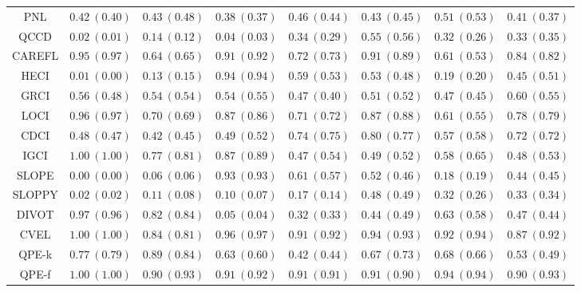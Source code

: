 \documentclass{article}
\theoremstyle{plain}
\theoremstyle{definition}
\theoremstyle{remark}
\begin{document}
{\begin{table}[!htbp]
\begin{center}
{\begin{tabular}{c|ccc|cccc}
PNL& $0.42\ (0.40)$& $0.43\ (0.48)$& $0.38\ (0.37)$& $0.46\ (0.44)$& $0.43\ (0.45)$& $0.51\ (0.53)$& $0.41\ (0.37)$ \\
QCCD& $0.02\ (0.01)$& $0.14\ (0.12)$& $0.04\ (0.03)$& $0.34\ (0.29)$& $0.55\ (0.56)$& $0.32\ (0.26)$& $0.33\ (0.35)$ \\
CAREFL& $0.95\ (0.97)$& $0.64\ (0.65)$& $0.91\ (0.92)$& $0.72\ (0.73)$& $0.91\ (0.89)$& $0.61\ (0.53)$& $0.84\ (0.82)$ \\
HECI& $0.01\ (0.00)$& $0.13\ (0.15)$& $0.94\ (0.94)$& $0.59\ (0.53)$& $0.53\ (0.48)$& $0.19\ (0.20)$& $0.45\ (0.51)$ \\
GRCI& $0.56\ (0.48)$& $0.54\ (0.54)$& $0.54\ (0.55)$& $0.47\ (0.40)$& $0.51\ (0.52)$& $0.47\ (0.45)$& $0.60\ (0.55)$ \\
LOCI& $0.96\ (0.97)$& $0.70\ (0.69)$& $0.87\ (0.86)$& $0.71\ (0.72)$& $0.87\ (0.88)$& $0.61\ (0.55)$& $0.78\ (0.79)$ \\
CDCI& $0.48\ (0.47)$& $0.42\ (0.45)$& $0.49\ (0.52)$& $0.74\ (0.75)$& $0.80\ (0.77)$& $0.57\ (0.58)$& $0.72\ (0.72)$ \\
IGCI& $\bm{1.00}\ (1.00)$& $0.77\ (0.81)$& $0.87\ (0.89)$& $0.47\ (0.54)$& $0.49\ (0.52)$& $0.58\ (0.65)$& $0.48\ (0.53)$ \\
SLOPE& $0.00\ (0.00)$& $0.06\ (0.06)$& $0.93\ (0.93)$& $0.61\ (0.57)$& $0.52\ (0.46)$& $0.18\ (0.19)$& $0.44\ (0.45)$ \\
SLOPPY& $0.02\ (0.02)$& $0.11\ (0.08)$& $0.10\ (0.07)$& $0.17\ (0.14)$& $0.48\ (0.49)$& $0.32\ (0.26)$& $0.33\ (0.34)$ \\
DIVOT& $0.97\ (0.96)$& $0.82\ (0.84)$& $0.05\ (0.04)$& $0.32\ (0.33)$& $0.44\ (0.49)$& $0.63\ (0.58)$& $0.47\ (0.44)$ \\
CVEL& $\bm{1.00}\ (1.00)$& $0.84\ (0.81)$& $\bm{0.96}\ (0.97)$& $\bm{0.91}\ (0.92)$& $\bm{0.94}\ (0.93)$& $0.92\ (0.94)$& $0.87\ (0.92)$ \\
\midrule
QPE-k& $0.77\ (0.79)$& $0.89\ (0.84)$& $0.63\ (0.60)$& $0.42\ (0.44)$& $0.67\ (0.73)$& $0.68\ (0.66)$& $0.53\ (0.49)$ \\
QPE-f& $\bm{1.00}\ (1.00)$& $\bm{0.90}\ (0.93)$& $0.91\ (0.92)$& $\bm{0.91}\ (0.91)$& $0.91\ (0.90)$& $\bm{0.94}\ (0.94)$& $\bm{0.90}\ (0.93)$ \\
\bottomrule
\end{tabular}%
}
\end{center}
\end{table}%
\vspace*{\fill}
}%
\end{document}
